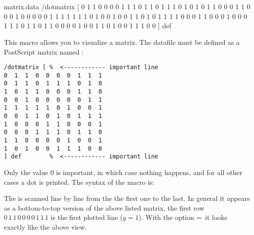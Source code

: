 \documentclass[11pt,english,BCOR10mm,DIV12,bibliography=totoc,parskip=false,smallheadings
    headexclude,footexclude,oneside]{pst-doc}
\begin{document}


\clearpage
\section{}\label{sec:psMatrix}
\begin{filecontents}{matrix.data}
/dotmatrix [ %
0  1  1  0  0  0  0  1  1  1
0  1  1  0  1  1  1  0  1  0
1  0  1  1  0  0  0  1  1  0
0  0  1  0  0  0  0  0  1  1
1  1  1  1  1  0  1  0  0  1
0  0  1  1  0  1  0  1  1  1
1  0  0  0  1  1  0  0  0  1
0  0  0  1  1  1  0  1  1  0
1  1  0  0  0  0  1  0  0  1
1  0  1  0  0  1  1  1  0  0
] def
\end{filecontents}


This macro allows you to visualize a matrix. The datafile must be
defined as a PostScript matrix named :
\begin{lstlisting}[style=syntax]
/dotmatrix [ %  <------------ important line
0  1  1  0  0  0  0  1  1  1
0  1  1  0  1  1  1  0  1  0
1  0  1  1  0  0  0  1  1  0
0  0  1  0  0  0  0  0  1  1
1  1  1  1  1  0  1  0  0  1
0  0  1  1  0  1  0  1  1  1
1  0  0  0  1  1  0  0  0  1
0  0  0  1  1  1  0  1  1  0
1  1  0  0  0  0  1  0  0  1
1  0  1  0  0  1  1  1  0  0
] def        %  <------------ important line
\end{lstlisting}

Only the value 0 is important, in which case nothing happens, and
for all other cases a dot is printed. The syntax of the macro is:

\begin{BDef}
\OptArgs{}
\end{BDef}

The  is scanned line by line from the the first one to the
last. In general it appears as a bottom-to-top version of the
above listed matrix, the first row $0\,1\,1\,0\,0\,0\,0\,1\,1\,1$
is the first plotted line ($y=1$). With the option
=\true\ it looks exactly like the above view.

\bgroup
\begin{center}
\quad
{}
\end{center}
\end{document}
